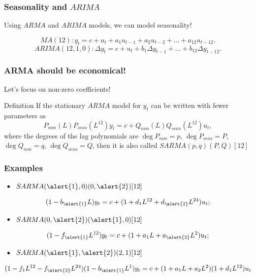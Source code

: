 \begin{frame}
	\frametitle{Seasonality and $ARIMA$}
	
	Using $ARMA$ and $ARIMA$ models, we can model seasonality!
	
	\pause
	\[
	MA(12): y_t = c + u_t + a_1 u_{t-1} + a_2 u_{t-2} + \ldots + a_{12} u_{t-12}.
	\]
	\[
	ARIMA(12, 1, 0): \Delta y_t = c + u_t + b_1 \Delta y_{t-1} + \ldots + b_{12} \Delta y_{t-12}.
	\]
	
\end{frame}



\begin{frame}
	\frametitle{ARMA should be economical!}
	
	Let's focus on \alert{non-zero} coefficients!
	\pause
	\begin{block}{Definition}
		If the stationary $ARMA$ model for $y_t$ can be written with fewer parameters as
		\[
		P_{non}(L)P_{seas}(L^{12}) y_t = c + Q_{non}(L) Q_{seas}(L^{12}) u_t,
		\]
		where the degrees of the lag polynomials are $\deg P_{non} =p$, $\deg P_{seas} =P$, $\deg Q_{non} =q$, $\deg Q_{seas} =Q$,
		then it is also called $SARMA(p, q)(P, Q)[12]$
	\end{block}
\end{frame}


\begin{frame}
	\frametitle{Examples}
	
	\begin{itemize}
		\item $SARMA(\alert{1},0)(0,\alert{2})[12]$
	\end{itemize}
	
	
		\[
		(1 - b_{\alert{1}} L) y_t = c + (1 + d_1 L^{12} + d_{\alert{2}} L^{24}) u_t;
		\]
	
	\pause 
		
	\begin{itemize}
		
		\item $SARMA(0,\alert{2})(\alert{1},0)[12]$
	\end{itemize}		

		\[
(1 - f_{\alert{1}} L^{12}) y_t = c + (1 + a_1 L + a_{\alert{2}} L^2) u_t;
\]

		
	\pause 
		
	\begin{itemize}
		
		\item $SARMA(\alert{1},\alert{2})(2,1)[12]$
	\end{itemize}



		\[
		(1 - f_1 L^{12} - f_{\alert{2}} L^{24}) (1 - b_{\alert{1}} L^1) y_t = c + (1 + a_1 L + a_2 L^2) (1 + d_1 L^{12}) u_t
		\]
	
	
	
\end{frame}






